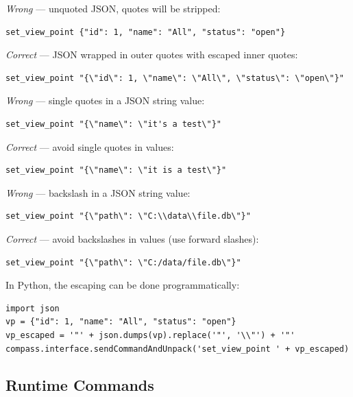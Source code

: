\textit{Wrong} --- unquoted JSON, quotes will be stripped:
\begin{lstlisting}[basicstyle=\small\ttfamily]
set_view_point {"id": 1, "name": "All", "status": "open"}
\end{lstlisting}

\textit{Correct} --- JSON wrapped in outer quotes with escaped inner quotes:
\begin{lstlisting}[basicstyle=\small\ttfamily]
set_view_point "{\"id\": 1, \"name\": \"All\", \"status\": \"open\"}"
\end{lstlisting}

\textit{Wrong} --- single quotes in a JSON string value:
\begin{lstlisting}[basicstyle=\small\ttfamily]
set_view_point "{\"name\": \"it's a test\"}"
\end{lstlisting}

\textit{Correct} --- avoid single quotes in values:
\begin{lstlisting}[basicstyle=\small\ttfamily]
set_view_point "{\"name\": \"it is a test\"}"
\end{lstlisting}

\textit{Wrong} --- backslash in a JSON string value:
\begin{lstlisting}[basicstyle=\small\ttfamily]
set_view_point "{\"path\": \"C:\\data\\file.db\"}"
\end{lstlisting}

\textit{Correct} --- avoid backslashes in values (use forward slashes):
\begin{lstlisting}[basicstyle=\small\ttfamily]
set_view_point "{\"path\": \"C:/data/file.db\"}"
\end{lstlisting}

In Python, the escaping can be done programmatically: \\

\begin{lstlisting}[basicstyle=\small\ttfamily]
import json
vp = {"id": 1, "name": "All", "status": "open"}
vp_escaped = '"' + json.dumps(vp).replace('"', '\\"') + '"'
compass.interface.sendCommandAndUnpack('set_view_point ' + vp_escaped)
\end{lstlisting}

\subsection{Runtime Commands}

